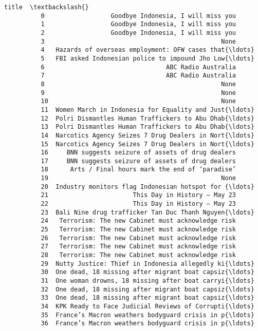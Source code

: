 \documentclass[11pt]{article}
\begin{document}
\begin{Verbatim}[commandchars=\\\{\}]
                                                          title  \textbackslash{}
          0                  Goodbye Indonesia, I will miss you   
          1                  Goodbye Indonesia, I will miss you   
          2                  Goodbye Indonesia, I will miss you   
          3                                                None   
          4   Hazards of overseas employment: OFW cases that{\ldots}   
          5   FBI asked Indonesian police to impound Jho Low{\ldots}   
          6                                 ABC Radio Australia   
          7                                 ABC Radio Australia   
          8                                                None   
          9                                                None   
          10                                               None   
          11  Women March in Indonesia for Equality and Just{\ldots}   
          12  Polri Dismantles Human Traffickers to Abu Dhab{\ldots}   
          13  Polri Dismantles Human Traffickers to Abu Dhab{\ldots}   
          14  Narcotics Agency Seizes 7 Drug Dealers in Nort{\ldots}   
          15  Narcotics Agency Seizes 7 Drug Dealers in Nort{\ldots}   
          16     BNN suggests seizure of assets of drug dealers   
          17     BNN suggests seizure of assets of drug dealers   
          18      Arts / Final hours mark the end of ‘paradise’   
          19                                               None   
          20  Industry monitors flag Indonesian hotspot for {\ldots}   
          21                       This Day in History — May 23   
          22                       This Day in History — May 23   
          23  Bali Nine drug trafficker Tan Duc Thanh Nguyen{\ldots}   
          24   Terrorism: The new Cabinet must acknowledge risk   
          25   Terrorism: The new Cabinet must acknowledge risk   
          26   Terrorism: The new Cabinet must acknowledge risk   
          27   Terrorism: The new Cabinet must acknowledge risk   
          28   Terrorism: The new Cabinet must acknowledge risk   
          29  Nutty Justice: Thief in Indonesia allegedly ki{\ldots}   
          30  One dead, 18 missing after migrant boat capsiz{\ldots}   
          31  One woman drowns, 18 missing after boat carryi{\ldots}   
          32  One dead, 18 missing after migrant boat capsiz{\ldots}   
          33  One dead, 18 missing after migrant boat capsiz{\ldots}   
          34  KPK Ready to Face Judicial Reviews of Corrupti{\ldots}   
          35  France’s Macron weathers bodyguard crisis in p{\ldots}   
          36  France’s Macron weathers bodyguard crisis in p{\ldots}   

\end{Verbatim}
\end{document}
